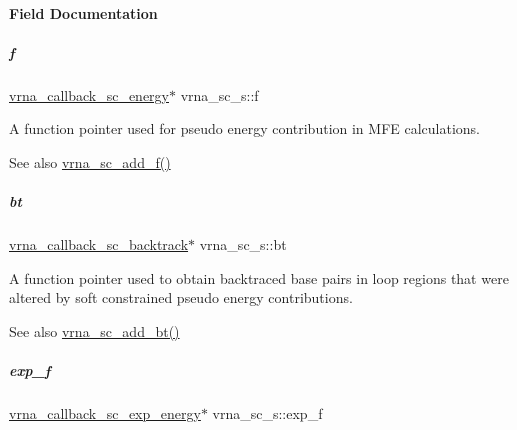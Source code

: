\paragraph{Field Documentation}
\mbox{\label{group__soft__constraints_a32dc86090237888c75491bbd4861a04b}} 
\subparagraph{\texorpdfstring{f}{f}}
{\footnotesize\ttfamily \hyperlink{group__soft__constraints_ga88a266695d9e25cc12114dceb7b4565e}{vrna\+\_\+callback\+\_\+sc\+\_\+energy}$\ast$ vrna\+\_\+sc\+\_\+s\+::f}



A function pointer used for pseudo energy contribution in M\+FE calculations. 

\begin{DoxySeeAlso}{See also}
\hyperlink{group__soft__constraints_ga8c7d907ec0125cd61c04e0908010a4e9}{vrna\+\_\+sc\+\_\+add\+\_\+f()} 
\end{DoxySeeAlso}
\mbox{\label{group__soft__constraints_a2a2aca01782c2b980d7b7fd05b9be89c}} 
\subparagraph{\texorpdfstring{bt}{bt}}
{\footnotesize\ttfamily \hyperlink{group__soft__constraints_gaeb6448da6c593d4c489c7fbadcb99499}{vrna\+\_\+callback\+\_\+sc\+\_\+backtrack}$\ast$ vrna\+\_\+sc\+\_\+s\+::bt}



A function pointer used to obtain backtraced base pairs in loop regions that were altered by soft constrained pseudo energy contributions. 

\begin{DoxySeeAlso}{See also}
\hyperlink{group__soft__constraints_gabde7d07a79bb9a8f4721aee247b674ea}{vrna\+\_\+sc\+\_\+add\+\_\+bt()} 
\end{DoxySeeAlso}
\mbox{\label{group__soft__constraints_a0de08a09f3ccf2f97974d23192668ab0}} 
\subparagraph{\texorpdfstring{exp\+\_\+f}{exp\_f}}
{\footnotesize\ttfamily \hyperlink{group__soft__constraints_ga4099978d410513edeeff8f3db13144c5}{vrna\+\_\+callback\+\_\+sc\+\_\+exp\+\_\+energy}$\ast$ vrna\+\_\+sc\+\_\+s\+::exp\+\_\+f}




